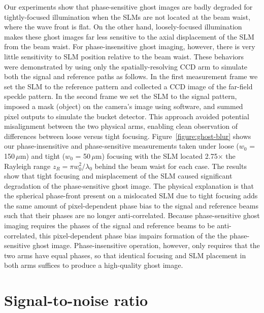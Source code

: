 Our experiments show that phase-sensitive ghost images are badly degraded for tightly-focused illumination when the SLMs are not located at the beam waist, where the wave front is flat. On the other hand, loosely-focused illumination makes these ghost images far less sensitive to the axial displacement of the SLM from the beam waist. For phase-insensitive ghost imaging, however, there is very little sensitivity to SLM position relative to the beam waist.  These behaviors were demonstrated by using only the spatially-resolving CCD arm to simulate both the signal and reference paths as follows.  In the first measurement frame we set the SLM to the reference pattern and collected a CCD image of the far-field speckle pattern.  In the second frame we set the SLM to the signal pattern, imposed a mask (object) on the camera's image using software, and summed pixel outputs to simulate the bucket detector. This approach avoided potential misalignment between the two physical arms, enabling clean observation of differences between loose versus tight focusing. Figure~\ref{figure:ghost-blur} shows our phase-insensitive and phase-sensitive measurements taken under loose ($w_0$ = 150\,$\mu$m) and tight ($w_0$ = 50\,$\mu$m) focusing with the SLM located 2.75$\times$ the Rayleigh range $z_R=\pi w_0^2/\lambda_0$ behind the beam waist for each case. The results show that tight focusing and misplacement of the SLM caused significant degradation of the phase-sensitive ghost image. The physical explanation is that the spherical phase-front present on a mislocated SLM due to tight focusing adds the same amount of pixel-dependent phase bias to the signal and reference beams such that their phases are no longer anti-correlated.   Because phase-sensitive ghost imaging requires the phases of the signal and reference beams to be anti-correlated, this pixel-dependent phase bias impairs formation of the the phase-sensitive ghost image.  Phase-insensitive operation, however, only requires that the two arms have equal phases, so that identical focusing and SLM placement in both arms suffices to produce a high-quality ghost image.

\section{Signal-to-noise ratio}

